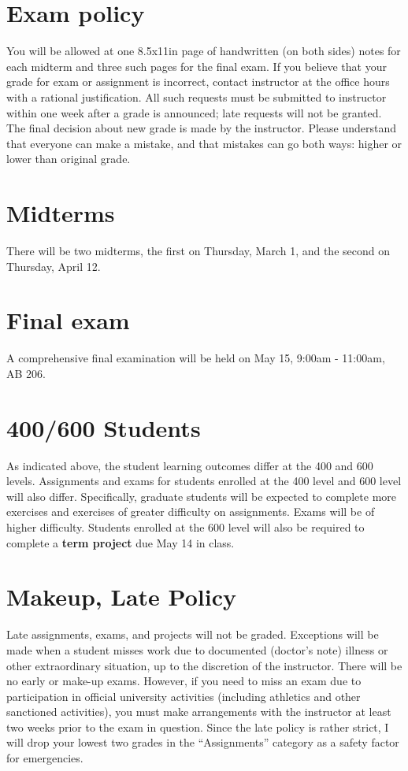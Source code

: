 \documentclass[11pt,onecolumn]{article}
\begin{document}
\section*{Exam policy} You will be allowed at one 8.5x11in page of handwritten (on both sides) notes for each midterm and three such pages for the final exam. If you believe that your grade for exam or assignment is incorrect, contact instructor at the office hours with a rational justification. All such requests must be submitted to instructor within one week after a grade is announced; late requests will not be granted. The final decision about new grade is made by the instructor. Please understand that everyone can make a mistake, and that mistakes can go both ways: higher or lower than original grade.

\section*{Midterms}
There will be two midterms, the first on Thursday, March 1, and the second on Thursday, April 12.

\section*{Final exam}
A comprehensive final examination will be held on May 15, 9:00am - 11:00am, AB 206.

\section*{400/600 Students}
As indicated above, the student learning outcomes differ at the 400 and 600 levels. Assignments and exams for students enrolled at the 400 level and 600 level will also differ. Specifically, graduate students will be expected to complete more exercises and exercises of greater difficulty on assignments. Exams will be of higher difficulty. Students enrolled at the 600 level will also be required to complete a \textbf{term project} due May 14 in class.

\section*{Makeup, Late Policy}
Late assignments, exams, and projects will not be graded. Exceptions will be made when a student misses work due to documented (doctor's note) illness or other extraordinary situation, up to the discretion of the instructor. There will be no early or make-up exams. However, if you need to miss an exam due to participation in official university activities (including athletics and other sanctioned activities), you must make arrangements with the instructor at least two weeks prior to the exam in question. Since the late policy is rather strict, I will drop your lowest two grades in the ``Assignments'' category as a safety factor for emergencies.
\end{document}
